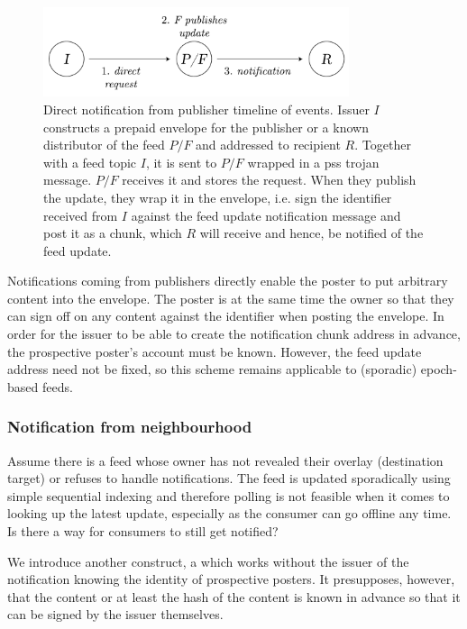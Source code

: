 \begin{figure}[htbp]
   \centering
    \includegraphics[width=0.8\textwidth]{fig/direct-notification-events.pdf}
   \caption[Direct notification from publisher timeline of events \statusgreen]{Direct notification from publisher timeline of events. Issuer $I$ constructs a prepaid envelope for the publisher or a known distributor of the feed $P/F$ and addressed to recipient $R$. Together with a feed topic $I$, it is sent to $P/F$ wrapped in a pss trojan message. $P/F$ receives it and stores the request. When they publish the update, they wrap it in the envelope, i.e. sign the identifier received from $I$ against the feed update notification message and post it as a chunk, which $R$ will receive and hence, be notified of the feed update. }
   \label{fig:direct-notification-events}
\end{figure}


Notifications coming from publishers directly enable the poster to put arbitrary content into the envelope. The poster is at the same time the owner so that they can sign off on any content against the identifier when posting the envelope. In order for the issuer to be able to create the notification chunk address in advance, the prospective poster's account must be known. However, the feed update address need not be fixed, so this scheme remains applicable to (sporadic) epoch-based feeds.

\subsubsection{Notification from neighbourhood}

Assume there is a feed whose owner has not revealed their overlay (destination target) or refuses to handle notifications.  The feed is updated sporadically using simple sequential indexing and therefore polling is not feasible when it comes to looking up the latest update, especially as the consumer can go offline any time.
Is there a way for consumers to still get notified? 

We introduce another construct, a  which works without the issuer of the notification knowing the identity of prospective posters. It presupposes, however, that the content or at least the hash of the content is known in advance so that it can be signed by the issuer themselves.


